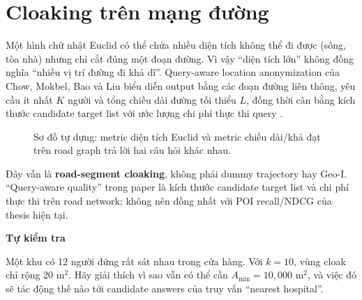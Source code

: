 \documentclass[11pt,a4paper,oneside]{report}
\newenvironment{exercisebox}[1][Tự kiểm tra]{%
  \par\medskip\noindent\begin{lrbox}{\exercisestore}\begin{minipage}{.89\textwidth}
  {\sffamily\bfseries\color{amber}#1}\par\smallskip}{%
  \end{minipage}\end{lrbox}\begin{center}\setlength{\fboxsep}{7pt}%
  \fcolorbox{amber}{lightamber}{\usebox{\exercisestore}}\end{center}\medskip}
\begin{document}
\section{Cloaking trên mạng đường}

Một hình chữ nhật Euclid có thể chứa nhiều diện tích không thể đi được (sông, tòa
nhà) nhưng chỉ cắt đúng một đoạn đường. Vì vậy ``diện tích lớn'' không đồng nghĩa
``nhiều vị trí đường đi khả dĩ''. Query-aware location anonymization của Chow,
Mokbel, Bao và Liu biểu diễn output bằng các đoạn đường liên thông, yêu cầu ít nhất
$K$ người và tổng chiều dài đường tối thiểu $L$, đồng thời cân bằng kích thước
candidate target list với ước lượng chi phí thực thi query
\cite{chow2011road}.

\begin{figure}[htbp]
\centering
{}
\caption{Sơ đồ tự dựng: metric diện tích Euclid và metric chiều dài/khả đạt trên road graph trả lời hai câu hỏi khác nhau.}
\label{fig:road-cloak}
\end{figure}

Đây vẫn là \textbf{road-segment cloaking}, không phải dummy trajectory hay Geo-I.
``Query-aware quality'' trong paper là kích thước candidate target list và chi phí
thực thi trên road network;
không nên đồng nhất với POI recall/NDCG của thesis hiện tại.

\begin{exercisebox}
Một khu có 12 người đứng rất sát nhau trong cửa hàng. Với $k=10$, vùng cloak chỉ
rộng 20 m$^2$. Hãy giải thích vì sao vẫn có thể cần $A_{\min}=10{,}000$ m$^2$, và
việc đó sẽ tác động thế nào tới candidate answers của truy vấn ``nearest hospital''.
\end{exercisebox}
\end{document}
